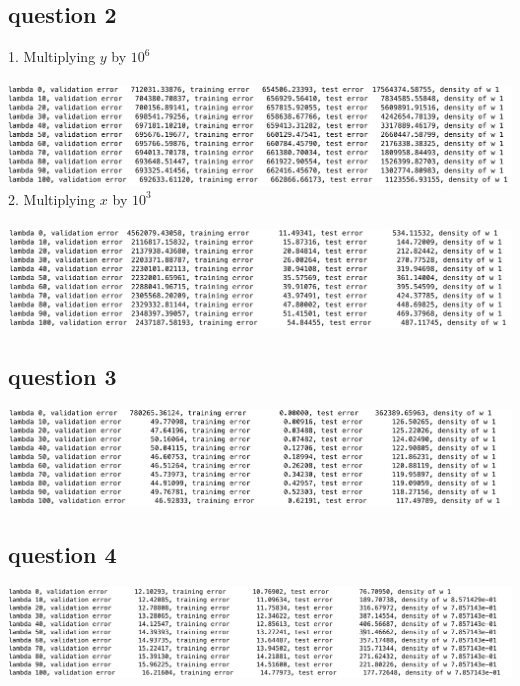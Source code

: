 \documentclass[11pt]{article} %
\begin{document}
\subsection{question 2}
1. Multiplying $y$ by $10^{6}$\\\\
\includegraphics[scale=0.5]{e2q2y}\\
2. Multiplying $x$ by $10^{3}$\\\\
\includegraphics[scale=0.5]{e2q2x}\\
\subsection{question 3}
\includegraphics[scale=0.5]{e2q3}\\

\subsection{question 4}
\includegraphics[scale=0.45]{e2q4}\\
\end{document}
